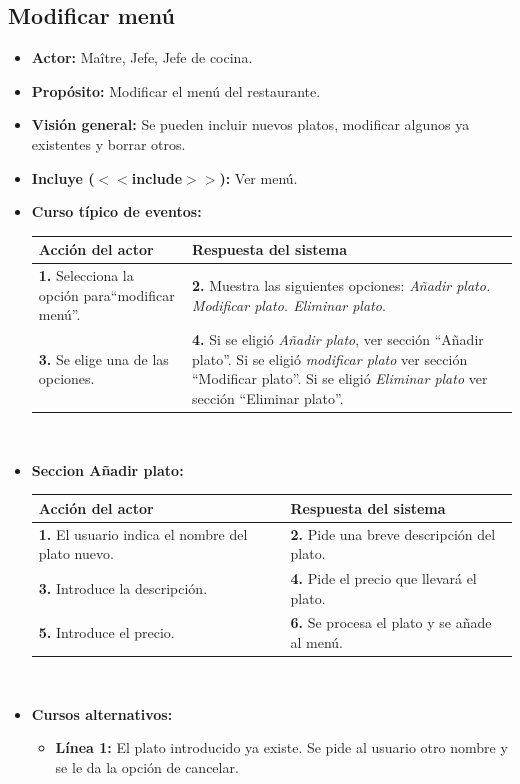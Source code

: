 \documentclass[spanish,a4paper,11pt, twoside]{report}	%
\begin{document}
		\subsection{Modificar menú}
			\begin{itemize}
			\item \textbf{Actor:} Maître, Jefe, Jefe de cocina.
			\item \textbf{Propósito:} Modificar el menú del restaurante.
			\item \textbf{Visión general:} Se pueden incluir nuevos platos, modificar algunos ya existentes y borrar otros.
			\item \textbf{Incluye ($<<$include$>>$):} Ver menú.
			\item \textbf{Curso típico de eventos:} 	\\
			\begin{tabular}{|p{6cm}||p{6cm}|}
				\hline
				\textbf{Acción del actor} & \textbf{Respuesta del sistema} \\ \hline \hline
				\textbf{1.} Selecciona la opción para``modificar menú''. & 
				\textbf{2.} Muestra las siguientes opciones: 
					\textit{Añadir plato. Modificar plato. Eliminar plato}. \\ \hline
				\textbf{3.} Se elige una de las opciones.	& 
				\textbf{4.} Si se eligió \textit{Añadir plato}, ver sección ``Añadir plato''. 
					Si se eligió \textit{modificar plato} ver sección ``Modificar plato''. 
					Si se eligió \textit{Eliminar plato} ver sección ``Eliminar plato''. \\ \hline
			\end{tabular}
			\\
			
			
			\item \textbf{Seccion Añadir plato:}  \\
					\begin{tabular}{|p{6cm}||p{6cm}|}
					\hline
					\textbf{Acción del actor} & \textbf{Respuesta del sistema} \\ \hline \hline
					\textbf{1.} El usuario indica el nombre del plato nuevo. & 
					\textbf{2.} Pide una breve descripción del plato. \\ \hline
					\textbf{3.} Introduce la descripción.	& 
					\textbf{4.} Pide el precio que llevará el plato. \\ \hline
					\textbf{5.} Introduce el precio. & 
					\textbf{6.} Se procesa el plato y se añade al menú. \\ \hline
				\end{tabular}
			\\
			\item \textbf{Cursos alternativos:} 
			\begin{itemize}
				\item  \textbf{Línea 1:} El plato introducido ya existe. Se pide al usuario otro
				nombre y se le da la opción de cancelar.
			\end {itemize}
			

\end{itemize}
\end{document}
